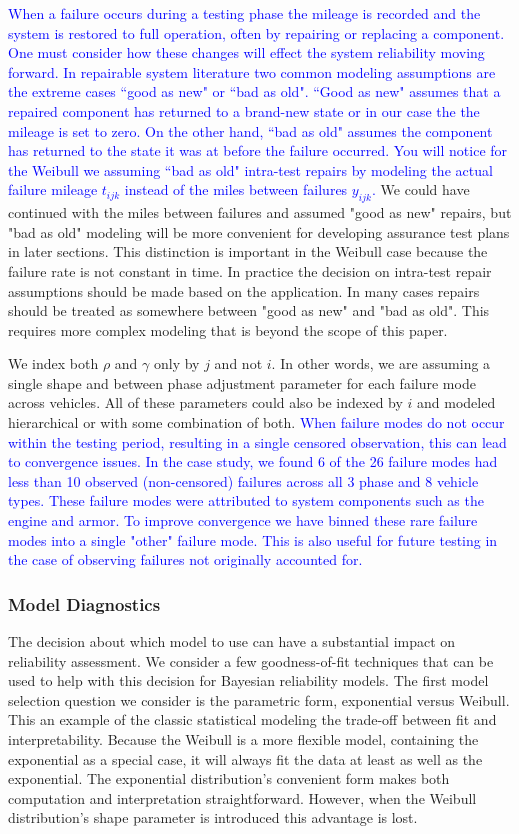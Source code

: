 \documentclass[12pt]{article}
\begin{document}
\textcolor{blue}{When a failure occurs during a testing phase the mileage is recorded and the system is restored to full operation, often by repairing or replacing a component.  One must consider how these changes will effect the system reliability moving forward.  In repairable system literature two common modeling assumptions are the extreme cases ``good as new" or ``bad as old".  ``Good as new" assumes that a repaired component has returned to a brand-new state or in our case the the mileage is set to zero.  On the other hand, ``bad as old" assumes the component has returned to the state it was at before the failure occurred.  You will notice for the Weibull we assuming ``bad as old" intra-test repairs by modeling the actual failure mileage $t_{ijk}$ instead of the miles between failures $y_{ijk}$.}  We could have continued with the miles between failures and assumed "good as new" repairs, but "bad as old" modeling will be more
convenient for developing assurance test plans in later sections.  This distinction is important in the Weibull case because the failure rate is not constant in time. In practice the decision on intra-test repair assumptions should be made based on the application.  In many cases repairs should be treated as somewhere between "good as new" and "bad as old".  This requires more complex modeling that is beyond the scope of this paper.

We index both $\rho$ and
$\gamma$ only by $j$ and not $i$. In other words, we are assuming a single
shape and between phase adjustment parameter for each failure mode across
vehicles.  All of these parameters could also be indexed by $i$ and modeled
hierarchical or with some combination of both. \textcolor{blue}{When failure modes do not occur within the testing period, resulting in a single censored observation, this can lead to convergence issues.  In the case study, we found 6 of the 26 failure modes had less than 10 observed (non-censored) failures across all 3 phase and 8 vehicle types.  These failure modes were attributed to system components such as the engine and armor.  To improve convergence we have binned these rare failure modes into a single "other" failure mode.  This is also useful for future testing in the case of observing failures not originally accounted for. }

\subsubsection{Model Diagnostics}
The decision about which model to
use can have a substantial impact on reliability assessment.  We consider a
few  goodness-of-fit techniques that can be used to help with this decision for Bayesian reliability models.  The
first model selection question we consider is the parametric form,
exponential versus Weibull.  This an example of the classic statistical modeling
the trade-off between fit and interpretability.  Because the Weibull is a more
flexible model, containing the exponential as a special case, it will always fit the data at least as well as the exponential.  The exponential distribution's convenient form makes both computation and
interpretation straightforward.  However, when the Weibull distribution's shape parameter is
introduced this advantage is lost.
\end{document}
